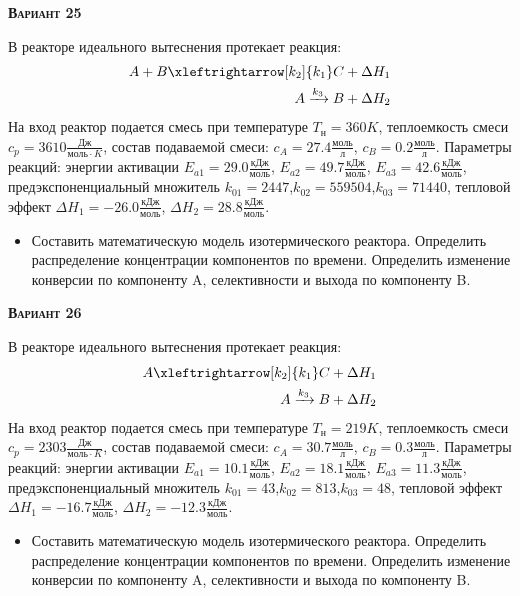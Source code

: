 \textsc{\textbf{Вариант 25}}

 В реакторе идеального вытеснения протекает реакция: \begin{equation*} \begin{aligned} A+B \xleftrightarrow[k_2]{k_1} C +\Delta H_1 \\ A \xrightarrow{k_3} B + \Delta H_2 \end{aligned} \end{equation*}                             На вход  реактор подается смесь при температуре $ T_{н} =  360 K$, теплоемкость смеси $c_p= 3610 \frac{Дж}{моль \cdot K}$, состав подаваемой смеси: $c_A=27.4 \frac{моль}{л}$, $c_B=0.2 \frac{моль}{л}$. Параметры реакций: энергии активации $E_{a1}=29.0 \frac{кДж}{моль}$, $E_{a2}=49.7  \frac{кДж}{моль}$, $E_{a3}=42.6  \frac{кДж}{моль}$, предэкспоненциальный множитель $k_{01}=      2447$,$k_{02}=    559504$,$k_{03}=     71440$, тепловой эффект $\Delta H_1= -26.0  \frac{кДж}{моль}$, $\Delta H_2=28.8 \frac{кДж}{моль}$.\begin{itemize} \item Составить математическую модель изотермического реактора. Определить распределение концентрации компонентов по времени. Определить изменение конверсии по компоненту A, селективности и выхода по компоненту B. \end{itemize}

\textsc{\textbf{Вариант 26}}

 В реакторе идеального вытеснения протекает реакция: \begin{equation*} \begin{aligned} A \xleftrightarrow[k_2]{k_1} C + \Delta H_1 \\ A \xrightarrow{k_3} B + \Delta H_2 \end{aligned} \end{equation*}                              На вход  реактор подается смесь при температуре $ T_{н} =  219 K$, теплоемкость смеси $c_p= 2303 \frac{Дж}{моль \cdot K}$, состав подаваемой смеси: $c_A=30.7 \frac{моль}{л}$, $c_B=0.3 \frac{моль}{л}$. Параметры реакций: энергии активации $E_{a1}=10.1 \frac{кДж}{моль}$, $E_{a2}=18.1  \frac{кДж}{моль}$, $E_{a3}=11.3  \frac{кДж}{моль}$, предэкспоненциальный множитель $k_{01}=        43$,$k_{02}=       813$,$k_{03}=        48$, тепловой эффект $\Delta H_1= -16.7  \frac{кДж}{моль}$, $\Delta H_2=-12.3 \frac{кДж}{моль}$.\begin{itemize} \item Составить математическую модель изотермического реактора. Определить распределение концентрации компонентов по времени. Определить изменение конверсии по компоненту A, селективности и выхода по компоненту B. \end{itemize}

